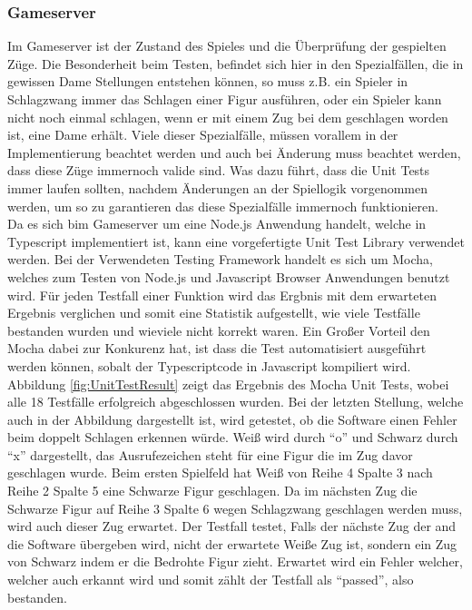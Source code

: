 \documentclass[12pt,a4paper,bibliography=totocnumbered,listof=totocnumbered]{article}
\begin{document}
\subsubsection{Gameserver}
Im Gameserver ist der Zustand des Spieles und die Überprüfung der gespielten Züge. 
Die Besonderheit beim Testen, befindet sich hier in den Spezialfällen, die in gewissen Dame Stellungen entstehen können, so muss z.B. ein
Spieler in Schlagzwang immer das Schlagen einer Figur ausführen, oder ein Spieler kann nicht noch einmal schlagen, wenn er mit einem Zug bei dem geschlagen worden ist,
eine Dame erhält. Viele dieser Spezialfälle, müssen vorallem in der Implementierung beachtet werden und auch bei Änderung muss beachtet werden, dass 
diese Züge immernoch valide sind. Was dazu führt, dass die Unit Tests immer laufen sollten, nachdem Änderungen an der Spiellogik vorgenommen werden,
um so zu garantieren das diese Spezialfälle immernoch funktionieren.
\\
Da es sich bim Gameserver um eine Node.js Anwendung handelt, welche in Typescript implementiert ist, kann eine vorgefertigte Unit Test Library verwendet werden.
Bei der Verwendeten Testing Framework handelt es sich um Mocha, welches zum Testen von Node.js und Javascript Browser Anwendungen benutzt wird. 
Für jeden Testfall einer Funktion wird das Ergbnis mit dem erwarteten Ergebnis verglichen und somit eine Statistik aufgestellt, wie viele Testfälle 
bestanden wurden und wieviele nicht korrekt waren. Ein Großer Vorteil den Mocha dabei zur Konkurenz hat, ist dass die Test automatisiert ausgeführt werden 
können, sobalt der Typescriptcode in Javascript kompiliert wird.
\\ 
Abbildung \ref{fig:UnitTestResult} zeigt das Ergebnis des Mocha Unit Tests, wobei alle 18 Testfälle erfolgreich abgeschlossen wurden.
Bei der letzten Stellung, welche auch in der Abbildung dargestellt ist, wird getestet, ob die Software einen Fehler beim doppelt Schlagen erkennen würde.
Weiß wird durch ``o'' und Schwarz durch ``x'' dargestellt, das Ausrufezeichen steht für eine Figur die im Zug davor geschlagen wurde. 
Beim ersten Spielfeld hat Weiß von Reihe 4 Spalte 3 nach Reihe 2 Spalte 5 eine Schwarze Figur geschlagen. Da im nächsten Zug die Schwarze Figur auf 
Reihe 3 Spalte 6 wegen Schlagzwang geschlagen werden muss, wird auch dieser Zug erwartet. Der Testfall testet, Falls der nächste Zug der 
and die Software übergeben wird, nicht der erwartete Weiße Zug ist, sondern ein Zug von Schwarz indem er die Bedrohte Figur zieht.
Erwartet wird ein Fehler welcher, welcher auch erkannt wird und somit zählt der Testfall als ``passed'', also bestanden.
\end{document}
